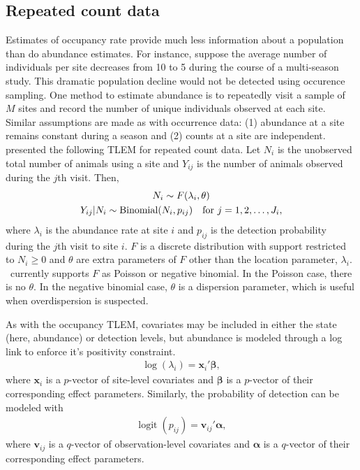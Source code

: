 \documentclass[article,shortnames]{jss}
\DeclareMathOperator{\logit}{logit}
\DeclareMathOperator{\Bin}{Binomial}
\newcommand{\um}{\pkg{unmarked}}
\begin{document}
\subsection{Repeated count data}
\label{sec:repeated-count-data}

Estimates of occupancy rate provide much less information about a
population than do abundance estimates. For instance, suppose the
average number of individuals per site decreases from 10 to 5 during
the course of a multi-season study. This dramatic population decline
would not be detected using occurence sampling.  One method to
estimate abundance is to repeatedly visit a sample of $M$ sites and
record the number of unique individuals observed at each site.
Similar assumptions are made as with occurrence data: (1) abundance at
a site remains constant during a season and (2) counts at a site are
independent.  \citet{Royle2004} presented the following TLEM for
repeated count data.  Let $N_i$ is the unobserved total number of
animals using a site and $Y_{ij}$ is the number of animals observed
during the $j$th visit.  Then,
\begin{gather}
  N_i \sim F(\lambda_i, \theta) \label{eq:pc2} \\
  Y_{ij}|N_{i} \sim \Bin(N_i, p_{ij})\text{\quad for $j=1,2,\dots,J_{i}$},
\end{gather}
where $\lambda_i$ is the abundance rate at site $i$ and $p_{ij}$ is
the detection probability during the $j$th visit to site $i$.  $F$ is
a discrete distribution with support restricted to $N_{i} \ge 0$ and
$\theta$ are extra parameters of $F$ other than the location
parameter, $\lambda_{i}$.  \um\ currently supports $F$ as Poisson or
negative binomial.  In the Poisson case, there is no $\theta$.  In the
negative binomial case, $\theta$ is a dispersion parameter, which is
useful when overdispersion is suspected.

As with the occupancy TLEM, covariates may be included in either the
state (here, abundance) or detection levels, but abundance is modeled
through a log link to enforce it's positivity constraint.
\begin{gather}
  \log(\lambda_i) = \mathbf x_i' \mathbf \beta,
\end{gather}
where $\mathbf x_i$ is a $p$-vector of site-level covariates and $\mathbf \beta$
is a $p$-vector of their corresponding effect parameters.  Similarly, the
probability of detection can be modeled with
\begin{gather}
  \logit(p_{ij}) = \mathbf v_{ij}' \mathbf \alpha,
\end{gather}
where $\mathbf v_{ij}$ is a $q$-vector of observation-level covariates and
$\mathbf \alpha$ is a $q$-vector of their corresponding effect parameters.
\end{document}
